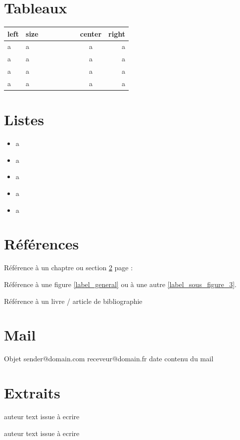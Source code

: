 \chapter{Tableaux}
	\begin{tabular}{|l|p{0.5\linewidth}|c|r |}
		\hline
		left & size & center & right \\
		\hline
		a & a & a & a \\
		a & a & a & a \\
		a & a & a & a \\
		a & a & a & a \\
		\hline
	\end{tabular}

\chapter{Listes} \label{ref_A}
	\begin{itemize}
		\item a
		\item a
		\item a
		\item a
		\item a
	\end{itemize}

\chapter{Références}
	Référence à un chaptre ou section \ref{ref_A} page : \pageref{ref_A}

	Référence à une figure \ref{label_general} ou à une autre \ref{label_sous_figure_3}.

	Référence à un livre / article de bibliographie \cite{id-12}

\chapter{Mail}
	\begin{mail}
		{Objet}
		{sender@domain.com}
		{receveur@domain.fr}
		{date}
		contenu du mail
	\end{mail}

\chapter{Extraits}
	\begin{extraitR}{auteur}
		text issue à ecrire
	\end{extraitR}
	\begin{extraitL}{auteur}
		text issue à ecrire
	\end{extraitL}



